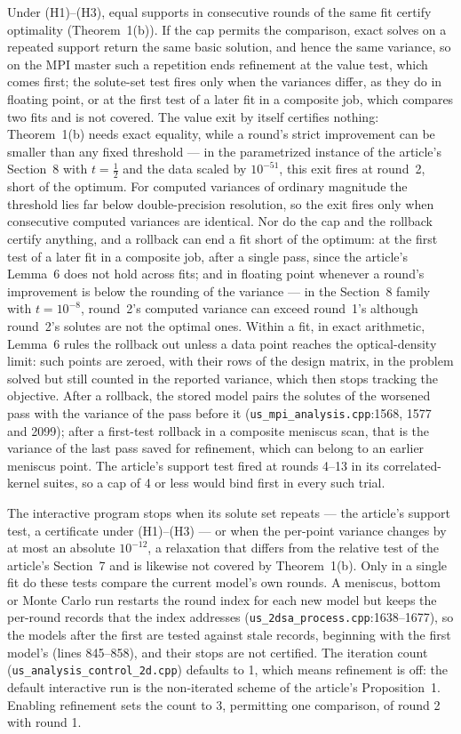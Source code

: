 \documentclass[pdflatex,sn-mathphys-num]{sn-jnl}
\begin{document}
Under (H1)--(H3), equal supports in consecutive rounds of the same fit
certify optimality (Theorem~1(b)). If the cap permits the comparison,
exact solves on a repeated support return the same basic solution, and
hence the same variance, so on the MPI master such a repetition ends
refinement at the value test, which comes first; the solute-set test
fires only when the variances differ, as they do in floating point, or
at the first test of a later fit in a composite job, which compares two
fits and is not covered. The value exit by itself certifies nothing:
Theorem~1(b) needs exact equality, while a round's strict improvement
can be smaller than any fixed threshold --- in the parametrized
instance of the article's Section~8 with $t=\tfrac12$ and the data
scaled by $10^{-51}$, this exit fires at round~2, short of the optimum.
For computed variances of ordinary magnitude the threshold lies far
below double-precision resolution, so the exit fires only when
consecutive computed variances are identical. Nor do the cap and the
rollback certify anything, and a rollback can end a fit short of the
optimum: at the first test of a later fit in a composite job, after a
single pass, since the article's Lemma~6 does not hold across fits; and
in floating point whenever a round's improvement is below the rounding
of the variance --- in the Section~8 family with $t=10^{-8}$, round~2's
computed variance can exceed round~1's although round~2's solutes are
not the optimal ones. Within a fit, in exact arithmetic, Lemma~6 rules
the rollback out unless a data point reaches the optical-density
limit: such points are zeroed, with their rows of the design matrix, in
the problem solved but still counted in the reported variance, which
then stops tracking the objective. After a rollback, the stored model
pairs the solutes of the worsened pass with the variance of the pass
before it (\texttt{us\_mpi\_analysis.cpp}:1568, 1577 and 2099); after a
first-test rollback in a composite meniscus scan, that is the variance
of the last pass saved for refinement, which can belong to an earlier
meniscus point. The article's support test fired at rounds
4--13 in its correlated-kernel suites, so a cap of 4 or less would bind
first in every such trial.

The interactive program stops when its solute set repeats --- the
article's support test, a certificate under (H1)--(H3) --- or when the
per-point variance changes by at most an absolute $10^{-12}$, a
relaxation that differs from the relative test of the article's
Section~7 and is likewise not covered by Theorem~1(b). Only in a
single fit do these tests compare the current model's own rounds. A
meniscus, bottom or Monte Carlo run restarts the round index for each new model but keeps
the per-round records that the index addresses
(\texttt{us\_2dsa\_process.cpp}:1638--1677), so the models after the
first are tested against stale records, beginning with the first
model's (lines 845--858), and their stops are not certified. The iteration count
(\texttt{us\_analysis\_control\_2d.cpp}) defaults to 1, which means
refinement is off: the default interactive run is the non-iterated
scheme of the article's Proposition~1. Enabling refinement sets the
count to 3, permitting one comparison, of round 2 with round 1.
\end{document}
